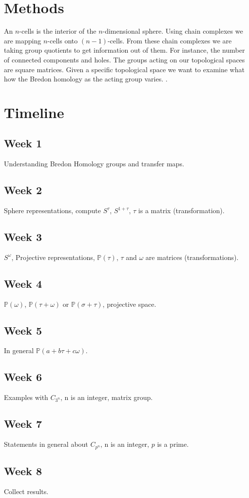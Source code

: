\documentclass[12pt]{article}
\begin{document}
\section{Methods}
An $n$-cells is the interior of the $n$-dimensional sphere. Using chain complexes we are mapping $n$-cells onto $(n-1)$-cells. From these chain complexes we are taking group quotients to get information out of them. For instance, the number of connected components and holes.\newline
The groups acting on our topological spaces are square matrices. Given a specific topological space we want to examine what how the Bredon homology as the acting group varies. .\newline

\section{Timeline}
\subsection{Week 1}
Understanding Bredon Homology groups and transfer maps.

\subsection{Week 2}
Sphere representations, compute $S^{\tau}$, $S^{1+\tau}$, $\tau$ is a matrix (transformation).

\subsection{Week 3}
$S^{\omega}$, Projective representations, $\mathbb{P}(\tau)$, $\tau$ and $\omega$ are matrices (transformations).

\subsection{Week 4}
$\mathbb{P}(\omega)$, $\mathbb{P}(\tau + \omega)$ or $\mathbb{P}(\sigma + \tau)$, projective space.

\subsection{Week 5}
In general $\mathbb{P}(a + b\tau + c\omega)$.

\subsection{Week 6}
Examples with $C_{3^n}$, n is an integer, matrix group.

\subsection{Week 7}
Statements in general about $C_{p^n}$, n is an integer, $p$ is a prime.

\subsection{Week 8}
Collect results.



\end{document}
